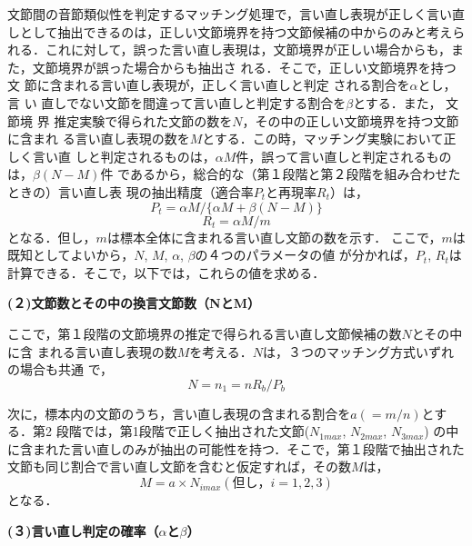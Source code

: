 文節間の音節類似性を判定するマッチング処理で，言い直し表現が正しく言い直
しとして抽出できるのは，正しい文節境界を持つ文節候補の中からのみと考えら
れる．これに対して，誤った言い直し表現は，文節境界が正しい場合からも，ま
た，文節境界が誤った場合からも抽出さ\break
れる．そこで，正しい文節境界を持つ文
節に含まれる言い直し表現が，正しく言い直しと判定\break
される割合を$\alpha$とし，言
い
直しでない文節を間違って言い直しと判定する割合を$\beta$とする．また，\break
文節境
界
推定実験で得られた文節の数を$N$，その中の正しい文節境界を持つ文節に含まれ
る言い直し表現の数を$M$とする．この時，マッチング実験において正しく言い直
しと判定されるものは，$\alpha M$件，誤って言い直しと判定されるもの
は，$\beta (N-M)$件
であるから，総合的な（第１段階と第２段階を組み合わせたときの）言い直し表
現の抽出精度（適合率$P_t$と再現率$R_t$）は，
\begin{equation}
 P_t =\alpha M /\{ \alpha M +\beta (N-M) \}
\end{equation}
\begin{equation}
 R_t =\alpha M / m
\end{equation}
となる．但し，$m$は標本全体に含まれる言い直し文節の数を示す．
ここで，$m$は既知としてよいから，$N$, $M$, $\alpha$, $\beta$の４つのパラメータの値
が分かれば，$P_t$, $R_t$は計算できる．そこで，以下では，これらの値を求める．
\begin{flushleft}
  \bf (２)文節数とその中の換言文節数（NとM）
\end{flushleft}

ここで，第１段階の文節境界の推定で得られる言い直し文節候補の数$N$とその中に含
まれる言い直し表現の数$M$を考える．$N$は，３つのマッチング方式いずれの場合も共通
で，
\begin{equation}
　N = n_1  = n R_b  / P_b
\end{equation}

次に，標本内の文節のうち，言い直し表現の含まれる割合を$a(=m/n)$とする．第2
段階では，第1段階で正しく抽出された文節($N_{1max}$, $N_{2max}$, $N_{3max}$)
の中に含まれた言い直しのみが抽出の可能性を持つ．そこで，第１段階で抽出された
文節も同じ割合で言い直し文節を含むと仮定すれば，その数$M$は，
\begin{equation}
  M = a \times N_{imax}(但し，i=1,2,3)
\end{equation}
となる．
\begin{flushleft}
  \bf (３)言い直し判定の確率（$\alpha$と$\beta$）
\end{flushleft}

